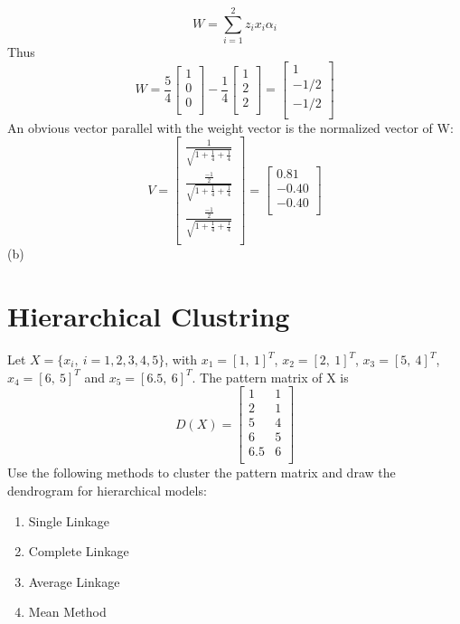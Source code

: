 \documentclass[12pt]{article}
\numberwithin{equation}{section}
\numberwithin{table}{section}
\numberwithin{figure}{section}
\begin{document}
\begin{equation}
	W = \sum_{i = 1}^{2}z_ix_i\alpha_i
\end{equation}
Thus
$$
	W = \frac{5}{4}\begin{bmatrix}
	1 \\
	0 \\
	0 \\
	\end{bmatrix} - \frac{1}{4}\begin{bmatrix}
	1 \\
	2 \\
	2 \\
	\end{bmatrix} = \begin{bmatrix}
	1 \\
	-1/2 \\
	-1/2 \\
	\end{bmatrix}
$$
An obvious vector parallel with the weight vector is the normalized vector of W:
$$
	V = \begin{bmatrix}
	\frac{1}{\sqrt{1 + \frac{1}{4} + \frac{1}{4}}} \\
	\frac{\frac{-1}{2}}{\sqrt{1 + \frac{1}{4} + \frac{1}{4}}} \\
	\frac{\frac{-1}{2}}{\sqrt{1 + \frac{1}{4} + \frac{1}{4}}} \\	
	\end{bmatrix} = \begin{bmatrix}
	 0.81 \\
	-0.40 \\
	-0.40 \\	
	\end{bmatrix}
$$
(b)
\section{Hierarchical Clustring}
Let $X = \{x_i,\ i = 1, 2, 3, 4, 5 \}$, with $x_1 = [1,\ 1]^T$, $x_2 = [2,\ 1]^T$, $x_3 = [5,\ 4]^T$, $x_4 = [6,\ 5]^T$ and $x_5 = [6.5,\ 6]^T$. The pattern matrix of X is
$$
	D(X) = \begin{bmatrix}
	1 & 1\\
	2 & 1\\
	5 & 4\\
	6 & 5\\
	6.5 & 6\\
	\end{bmatrix}
$$
Use the following methods to cluster the pattern matrix and draw the dendrogram for hierarchical models:
\begin{enumerate}[label=(\alph*)]
	\item Single Linkage
	\item Complete Linkage
	\item Average Linkage
	\item Mean Method
\end{enumerate}
\end{document}
